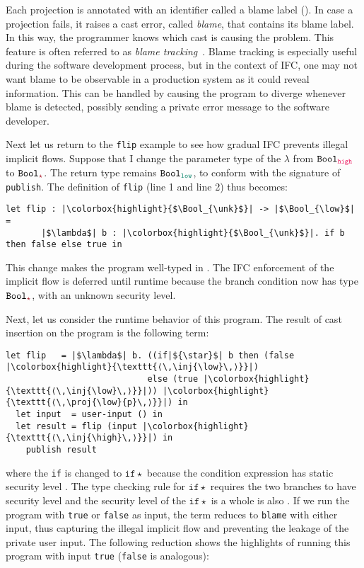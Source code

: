 Each projection is annotated with an identifier called a blame label
().  In case a projection fails, it raises a cast error,
called \textit{blame}, that contains its blame label. In this way, the
programmer knows which cast is causing the problem.  This feature is
often referred to as
\textit{blame tracking}~\parencite{Findler:2002eu,Wadler:2009qv}.
Blame tracking is especially useful during the software development
process, but in the context of IFC, one may not want blame to be
observable in a production system as it could reveal information.
This can be handled by causing the program to diverge whenever blame
is detected, possibly sending a private error message to the software
developer.

Next let us return to the \texttt{flip} example to see how gradual IFC prevents
illegal implicit flows. Suppose that I change the parameter type of the
$\lambda$ from $\Bool_{\high}$ to $\Bool_{\unk}$. The return type remains
$\Bool_{\low}$, to conform with the signature of \texttt{publish}. The
definition of \texttt{flip} (line 1 and line 2) thus becomes:

\begin{lstlisting}[style=tt]
  let flip : |\colorbox{highlight}{$\Bool_{\unk}$}| -> |$\Bool_{\low}$| =
       |$\lambda$| b : |\colorbox{highlight}{$\Bool_{\unk}$}|. if b then false else true in
\end{lstlisting}

\noindent This change makes the program well-typed in \Surface. The IFC
enforcement of the implicit flow is deferred until runtime because the branch
condition now has type $\Bool_{\unk}$, with an unknown security level.

Next, let us consider the runtime behavior of this program. The result of cast
insertion on the \Surface program is the following \CC term:

\begin{lstlisting}[style=tt]
  let flip   = |$\lambda$| b. ((if|${\star}$| b then (false |\colorbox{highlight}{\texttt{⟨\,\inj{\low}\,⟩}}|)
                            else (true |\colorbox{highlight}{\texttt{⟨\,\inj{\low}\,⟩}}|)) |\colorbox{highlight}{\texttt{⟨\,\proj{\low}{p}\,⟩}}|) in
  let input  = user-input () in
  let result = flip (input |\colorbox{highlight}{\texttt{⟨\,\inj{\high}\,⟩}}|) in
    publish result
\end{lstlisting}

\noindent where the \texttt{if} is changed
to $\mathtt{if}\star$ because the condition expression has static
security level \unk{}.  The type checking rule for $\mathtt{if}\star$
requires the two branches to have security level \unk{} and the
security level of the $\mathtt{if}\star$ is a whole is also \unk{}.
%
If we run the program with \texttt{true} or \texttt{false} as input, the \CC
term reduces to \texttt{blame}  with either input, thus capturing the
illegal implicit flow and preventing the leakage of the private user input. The
following reduction shows the highlights of running this program with input
\texttt{true} (\texttt{false} is analogous):

